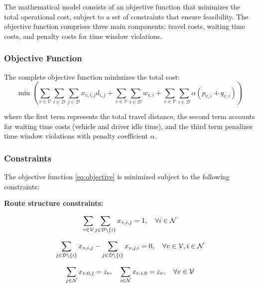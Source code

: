 The mathematical model consists of an objective function that minimizes the total operational cost, subject to a set of constraints that ensure feasibility. The objective function comprises three main components: travel costs, waiting time costs, and penalty costs for time window violations.

\subsubsection{Objective Function}

The complete objective function minimizes the total cost:
\begin{equation}\label{eq:objective}
     \min \left( \sum_{v \in \mathcal{V}} \sum_{i \in \mathcal{D}} \sum_{j \in \mathcal{D}}  x_{v,i,j} d_{i,j} + \sum_{v \in \mathcal{V}}\sum_{i \in \mathcal{D}} w_{v,i} + \sum_{v \in \mathcal{V}}\sum_{i \in \mathcal{D}} \alpha (p_{v,i} + q_{v,i}) \right)
\end{equation}

where the first term represents the total travel distance, the second term accounts for waiting time costs (vehicle and driver idle time), and the third term penalizes time window violations with penalty coefficient $\alpha$.

\subsubsection{Constraints}

The objective function \ref{eq:objective} is minimized subject to the following constraints:

\textbf{Route structure constraints:}

\begin{equation}{\label{eq:one_visit}}
     \sum_{v \in \mathcal{V}}\sum_{j \in \mathcal{D}\setminus \{i\}} x_{v,i,j}=1, \quad \forall i \in \mathcal{N}
\end{equation}

\begin{equation}{\label{eq:flow_balance}}
    \sum_{j\in\mathcal{D}\setminus\{i\}}x_{v,i,j}-\sum_{j\in\mathcal{D}\setminus\{i\}}x_{v,j,i}=0, \quad \forall v \in \mathcal{V}, i \in \mathcal{N}
\end{equation}

\begin{equation}{\label{eq:start_end_in_depot}}
    \sum_{j\in\mathcal{N}}x_{v,0,j}=z_v, \quad \sum_{i\in\mathcal{N}}x_{v,i,0}=z_v, \quad \forall v \in \mathcal{V}
\end{equation}

